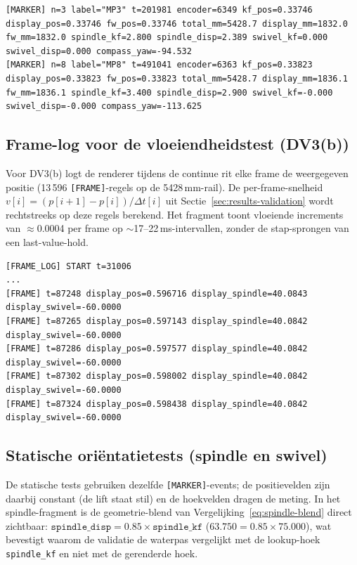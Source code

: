 \documentclass[10pt, a4paper, twocolumn]{article}
\begin{document}
\begin{lstlisting}
[MARKER] n=3 label="MP3" t=201981 encoder=6349 kf_pos=0.33746 display_pos=0.33746 fw_pos=0.33746 total_mm=5428.7 display_mm=1832.0 fw_mm=1832.0 spindle_kf=2.800 spindle_disp=2.389 swivel_kf=0.000 swivel_disp=0.000 compass_yaw=-94.532
[MARKER] n=8 label="MP8" t=491041 encoder=6363 kf_pos=0.33823 display_pos=0.33823 fw_pos=0.33823 total_mm=5428.7 display_mm=1836.1 fw_mm=1836.1 spindle_kf=3.400 spindle_disp=2.900 swivel_kf=-0.000 swivel_disp=-0.000 compass_yaw=-113.625
\end{lstlisting}

\subsection{Frame-log voor de vloeiendheidstest (DV3(b))}
Voor DV3(b) logt de renderer tijdens de continue rit elke frame de weergegeven
positie (13\,596 \texttt{[FRAME]}-regels op de 5428\,mm-rail). De per-frame-snelheid
$v[i]=(p[i{+}1]-p[i])/\Delta t[i]$ uit Sectie~\ref{sec:results-validation} wordt
rechtstreeks op deze regels berekend. Het fragment toont vloeiende increments
van $\approx$0.0004 per frame op $\sim$17--22\,ms-intervallen, zonder de
stap-sprongen van een last-value-hold.

\begin{lstlisting}
[FRAME_LOG] START t=31006
...
[FRAME] t=87248 display_pos=0.596716 display_spindle=40.0843 display_swivel=-60.0000
[FRAME] t=87265 display_pos=0.597143 display_spindle=40.0842 display_swivel=-60.0000
[FRAME] t=87286 display_pos=0.597577 display_spindle=40.0842 display_swivel=-60.0000
[FRAME] t=87302 display_pos=0.598002 display_spindle=40.0842 display_swivel=-60.0000
[FRAME] t=87324 display_pos=0.598438 display_spindle=40.0842 display_swivel=-60.0000
\end{lstlisting}

\subsection{Statische oriëntatietests (spindle en swivel)}
De statische tests gebruiken dezelfde \texttt{[MARKER]}-events; de positievelden
zijn daarbij constant (de lift staat stil) en de hoekvelden dragen de meting.
In het spindle-fragment is de geometrie-blend van
Vergelijking~\ref{eq:spindle-blend} direct zichtbaar:
$\texttt{spindle\_disp} = 0.85 \times \texttt{spindle\_kf}$
($63.750 = 0.85 \times 75.000$), wat bevestigt waarom de validatie de
waterpas vergelijkt met de lookup-hoek \texttt{spindle\_kf} en niet met de
gerenderde hoek.
\end{document}
